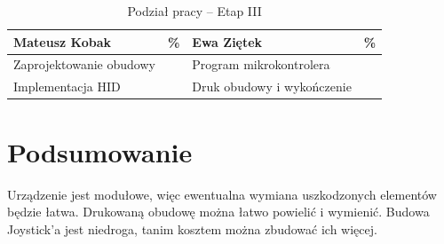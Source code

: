 \documentclass[10pt, a4paper]{article}
\begin{document}
\begin{table}[H]
	\centering
	\begin{tabular}{|L{7cm}|L{0.8cm}||L{7cm}|L{0.8cm}|}
		\hline
		\hline
		\textbf{Mateusz Kobak} & 
		\% & 
		\textbf{Ewa Ziętek} & \%\\
		\hline
		\hline
	Zaprojektowanie obudowy		& &	
		Program mikrokontrolera &\\
		\hline
	Implementacja HID  & &
		Druk obudowy i wykończenie &\\
		\hline

	\end{tabular}
	\caption{Podział pracy -- Etap III}
	\label{tab:PodzialPracyEtap3}
\end{table}



\section{Podsumowanie}

Urządzenie jest modułowe, więc ewentualna wymiana uszkodzonych elementów będzie łatwa. Drukowaną obudowę można łatwo powielić i wymienić. Budowa Joystick'a jest niedroga, tanim kosztem można zbudować ich więcej.

\newpage
{}


\end{document}
